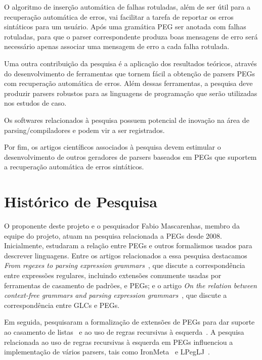 \documentclass[titlepage,12pt]{article}
\begin{document}
O algoritmo de inserção automática de falhas rotuladas, além de ser
útil para a recuperação automática de erros, vai facilitar a tarefa
de reportar os erros sintáticos para um usuário. Após uma gramática PEG
ser anotada com falhas rotuladas, para que o parser correspondente produza
boas mensagens de erro será necessário apenas associar uma mensagem de erro
a cada falha rotulada.

Uma outra contribuição da pesquisa é a aplicação dos resultados teóricos,
através do desenvolvimento de ferramentas que tornem fácil a obtenção de
parsers PEGs com recuperação automática de erros. Além dessas ferramentas,
a pesquisa deve produzir parsers robustos para as linguagens de programação
que serão utilizadas nos estudos de caso. 

Os softwares relacionados à pesquisa possuem potencial de inovação na área
de parsing/compiladores e podem vir a ser registrados.
 
Por fim, os artigos científicos associados à pesquisa devem estimular
o desenvolvimento de outros geradores de parsers baseados em PEGs
que suportem a recuperação automática de erros sintáticos.


\section{Histórico de Pesquisa}
\label{sec:hist}

O proponente deste projeto e o pesquisador Fabio Mascarenhas,
membro da equipe do projeto, atuam na pesquisa relacionada
a PEGs desde 2008. Inicialmente, estudaram a relação entre PEGs
e outros formalismos usados para descrever linguagens.
Entre os artigos relacionados a essa pesquisa destacamos 
\emph{From regexes to parsing expression grammars}~\cite{medeiros2014regexes},
que discute a correspondência entre expressões regulares, incluindo
extensões comumente usadas por ferramentas de casamento de padrões,
e PEGs; e o artigo \emph{On the relation between context-free grammars
and parsing expression grammars}~\cite{mascarenhas2014cfgpeg}, que
discute a correspondência entre GLCs e PEGs.

Em seguida, pesquisaram a formalização de extensões
de PEGs para dar suporte ao casamento de listas~\cite{mascarenhas2011list}
e ao uso de regras recursivas à esquerda~\cite{medeiros2014left}.
A pesquisa relacionada ao uso de regras recursivas à esquerda
em PEGs influenciou a implementação de vários parsers,
tais como IronMeta~\cite{ironmeta} e LPegLJ~\cite{lpeglj}.
\end{document}
